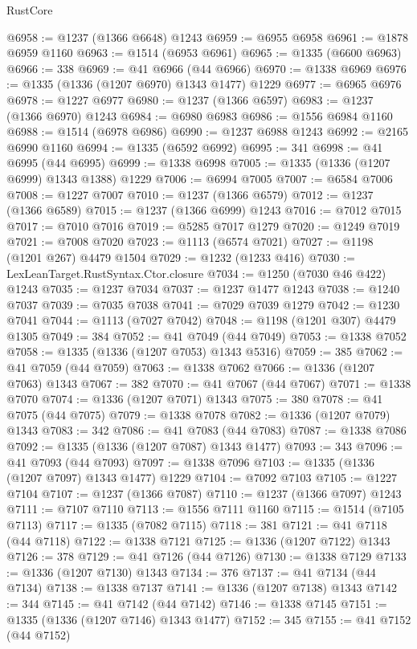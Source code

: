 \begin{lexlean}{RustCore}
\begin{coremodule}
@6958 := @1237 (@1366 @6648) @1243
@6959 := @6955 @6958
@6961 := @1878 @6959 @1160
@6963 := @1514 (@6953 @6961)
@6965 := @1335 (@6600 @6963)
@6966 := 338
@6969 := @41 @6966 (@44 @6966)
@6970 := @1338 @6969
@6976 := @1335 (@1336 (@1207 @6970) @1343 @1477) @1229
@6977 := @6965 @6976
@6978 := @1227 @6977
@6980 := @1237 (@1366 @6597)
@6983 := @1237 (@1366 @6970) @1243
@6984 := @6980 @6983
@6986 := @1556 @6984 @1160
@6988 := @1514 (@6978 @6986)
@6990 := @1237 @6988 @1243
@6992 := @2165 @6990 @1160
@6994 := @1335 (@6592 @6992)
@6995 := 341
@6998 := @41 @6995 (@44 @6995)
@6999 := @1338 @6998
@7005 := @1335 (@1336 (@1207 @6999) @1343 @1388) @1229
@7006 := @6994 @7005
@7007 := @6584 @7006
@7008 := @1227 @7007
@7010 := @1237 (@1366 @6579)
@7012 := @1237 (@1366 @6589)
@7015 := @1237 (@1366 @6999) @1243
@7016 := @7012 @7015
@7017 := @7010 @7016
@7019 := @5285 @7017 @1279
@7020 := @1249 @7019
@7021 := @7008 @7020
@7023 := @1113 (@6574 @7021)
@7027 := @1198 (@1201 @267) @4479 @1504
@7029 := @1232 (@1233 @416)
@7030 := LexLeanTarget.RustSyntax.Ctor.closure
@7034 := @1250 (@7030 @46 @422) @1243
@7035 := @1237 @7034
@7037 := @1237 @1477 @1243
@7038 := @1240 @7037
@7039 := @7035 @7038
@7041 := @7029 @7039 @1279
@7042 := @1230 @7041
@7044 := @1113 (@7027 @7042)
@7048 := @1198 (@1201 @307) @4479 @1305
@7049 := 384
@7052 := @41 @7049 (@44 @7049)
@7053 := @1338 @7052
@7058 := @1335 (@1336 (@1207 @7053) @1343 @5316)
@7059 := 385
@7062 := @41 @7059 (@44 @7059)
@7063 := @1338 @7062
@7066 := @1336 (@1207 @7063) @1343
@7067 := 382
@7070 := @41 @7067 (@44 @7067)
@7071 := @1338 @7070
@7074 := @1336 (@1207 @7071) @1343
@7075 := 380
@7078 := @41 @7075 (@44 @7075)
@7079 := @1338 @7078
@7082 := @1336 (@1207 @7079) @1343
@7083 := 342
@7086 := @41 @7083 (@44 @7083)
@7087 := @1338 @7086
@7092 := @1335 (@1336 (@1207 @7087) @1343 @1477)
@7093 := 343
@7096 := @41 @7093 (@44 @7093)
@7097 := @1338 @7096
@7103 := @1335 (@1336 (@1207 @7097) @1343 @1477) @1229
@7104 := @7092 @7103
@7105 := @1227 @7104
@7107 := @1237 (@1366 @7087)
@7110 := @1237 (@1366 @7097) @1243
@7111 := @7107 @7110
@7113 := @1556 @7111 @1160
@7115 := @1514 (@7105 @7113)
@7117 := @1335 (@7082 @7115)
@7118 := 381
@7121 := @41 @7118 (@44 @7118)
@7122 := @1338 @7121
@7125 := @1336 (@1207 @7122) @1343
@7126 := 378
@7129 := @41 @7126 (@44 @7126)
@7130 := @1338 @7129
@7133 := @1336 (@1207 @7130) @1343
@7134 := 376
@7137 := @41 @7134 (@44 @7134)
@7138 := @1338 @7137
@7141 := @1336 (@1207 @7138) @1343
@7142 := 344
@7145 := @41 @7142 (@44 @7142)
@7146 := @1338 @7145
@7151 := @1335 (@1336 (@1207 @7146) @1343 @1477)
@7152 := 345
@7155 := @41 @7152 (@44 @7152)

\end{coremodule}
\end{lexlean}
